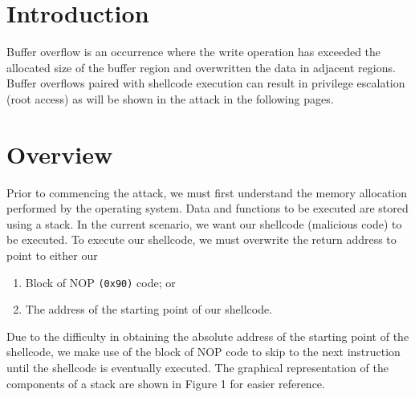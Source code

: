 \documentclass[a4paper,12pt]{article}
\begin{document}
\newpage
{}
\setcounter{section}{0}
\section{Introduction}
Buffer overflow is an occurrence where the write operation has exceeded the allocated size of the buffer region and overwritten the data in adjacent regions. Buffer overflows paired with shellcode execution can result in privilege escalation (root access) as will be shown in the attack in the following pages.
\section{Overview}
Prior to commencing the attack, we must first understand the memory allocation performed by the operating system. Data and functions to be executed are stored using a stack. In the current scenario, we want our shellcode (malicious code) to be executed. To execute our shellcode, we must overwrite the return address to point to either our \begin{enumerate}
	\item Block of NOP \texttt{(0x90)} code; or
	\item The address of the starting point of our shellcode.
\end{enumerate} Due to the difficulty in obtaining the absolute address of the starting point of the shellcode, we make use of the block of NOP code to skip to the next instruction until the shellcode is eventually executed. The graphical representation of the components of a stack are shown in Figure 1 for easier reference.
\iffalse
\begin{figure}[!h]
	\centering
	\begin{tikzpicture}
	\draw (-2,3) -- (-2,3.8);
	\draw (2,3) -- (2,3.8);
	\draw[fill=gray!40]  (-2,3)  rectangle node {Stack} (2,2.2);
	\draw (-2,2.2) rectangle (2,1.2);
	\draw[fill=gray!40]  (-2,1.2) rectangle node {Heap}(2,0.4);
	\draw (-2,0.4) rectangle node {BSS Segment} (2,-0.2);
	\draw (-2,-0.2) rectangle node {Data Segment} (2,-0.8);
	\draw (-2,-0.8) rectangle node {Text Segment} (2,-1.4);
	\draw(3.8,3) node[text width=3cm,align=left] {High Address} (3.8,-1.4) node[text width=3cm,align=left] {Low Address};
	\draw (-2,-1.4) -- (-2,-2.2);
	\draw (2,-1.4) -- (2,-2.2);
	\end{tikzpicture}
	\caption{Program Layout}
\end{figure}
\fi
\end{document}
